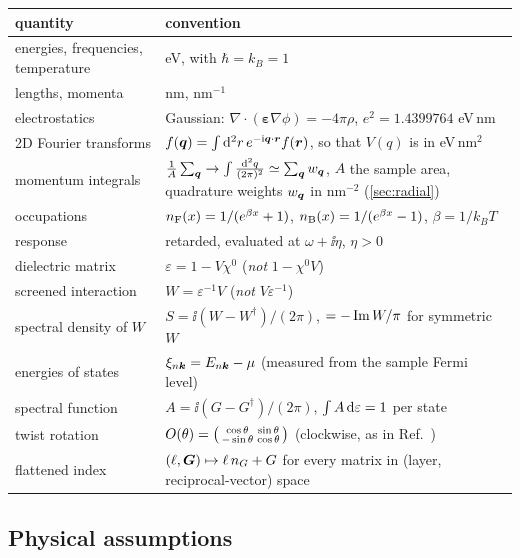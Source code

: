 \begin{center}
\begin{tabularx}{\textwidth}{lX}
\toprule
quantity & convention\\
\midrule
energies, frequencies, temperature & eV, with $\hbar=k_B=1$ \\
lengths, momenta & nm, nm$^{-1}$\\
electrostatics & Gaussian: $\nabla\cdot(\bm\varepsilon\nabla\phi)=-4\pi\rho$, $e^2=1.4399764$ eV\,nm\\
2D Fourier transforms & $f(\bm q)=\int\mathrm d^2r\,e^{-\mathrm i\bm q\cdot\bm r}f(\bm r)$, so that $V(q)$ is in eV\,nm$^2$\\
momentum integrals & $\frac1A\sum_{\bm q}\to\int\frac{\mathrm d^2q}{(2\pi)^2}\simeq\sum_{\bm q}w_{\bm q}$, $A$ the sample area, quadrature weights $w_{\bm q}$ in nm$^{-2}$ (\cref{sec:radial})\\
occupations & $n_{\rm F}(x)=1/(e^{\beta x}+1)$, $n_{\rm B}(x)=1/(e^{\beta x}-1)$, $\beta=1/k_BT$\\
response & retarded, evaluated at $\omega+\ii\eta$, $\eta>0$\\
dielectric matrix & $\varepsilon=1-V\chi^0$ \quad(\emph{not} $1-\chi^0V$)\\
screened interaction & $W=\varepsilon^{-1}V$ \quad(\emph{not} $V\varepsilon^{-1}$)\\
spectral density of $W$ & $S=\ii(W-W^\dagger)/(2\pi)$, $=-\operatorname{Im} W/\pi$ for symmetric $W$\\
energies of states & $\xi_{n\bm k}=E_{n\bm k}-\mu$ (measured from the sample Fermi level)\\
spectral function & $A=\ii(G-G^\dagger)/(2\pi)$, $\int A\,\mathrm d\varepsilon=1$ per state\\
twist rotation & $O(\theta)=\begin{psmallmatrix}\cos\theta&\sin\theta\\-\sin\theta&\cos\theta\end{psmallmatrix}$ (clockwise, as in Ref.~\cite{Wei2025})\\
flattened index & $(\ell,\bm G)\mapsto \ell\,n_G+G$ for every matrix in (layer, reciprocal-vector) space\\
\bottomrule
\end{tabularx}
\end{center}

\subsection{Physical assumptions}
\label{sec:assumptions}

